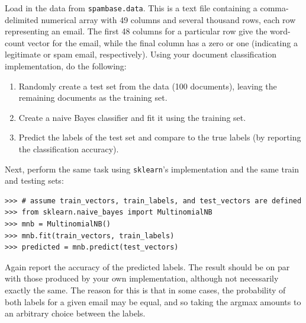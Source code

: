 \begin{problem}
Load in the data from {\tt spambase.data}. This is a text file containing a comma-delimited
numerical array with 49 columns and several thousand rows, each row representing an email. 
The first 48 columns for a particular row give the word-count vector for the email, while the
final column has a zero or one (indicating a legitimate or spam email, respectively).
Using your document classification implementation, do the following:
\begin{enumerate}
\item Randomly create a test set from the data (100 documents), leaving the remaining documents as the training set.
\item Create a naive Bayes classifier and fit it using the training set.
\item Predict the labels of the test set and compare to the true labels (by reporting the classification accuracy).
\end{enumerate}

Next, perform the same task using {\tt sklearn}'s implementation and the same train and testing sets:
\begin{lstlisting}
>>> # assume train_vectors, train_labels, and test_vectors are defined
>>> from sklearn.naive_bayes import MultinomialNB
>>> mnb = MultinomialNB()
>>> mnb.fit(train_vectors, train_labels)
>>> predicted = mnb.predict(test_vectors)
\end{lstlisting} 
Again report the accuracy of the predicted labels. The result should be on par with those produced by your
own implementation, although not necessarily exactly the same. The reason for this is that in some cases, the
probability of both labels for a given email may be equal, and so taking the argmax amounts to an arbitrary choice
between the labels.
\end{problem}


